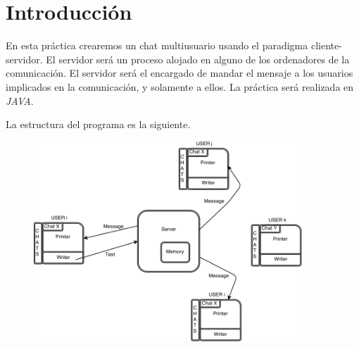 \section{Introducción}
En esta práctica crearemos un chat multiusuario usando el paradigma cliente-servidor.
El servidor será un proceso alojado en alguno de los ordenadores de la comunicación.
El servidor será el encargado de mandar el mensaje a los usuarios implicados en la comunicación, y solamente a ellos.
La práctica será realizada en \textit{JAVA}.

La estructura del programa es la siguiente.

\begin{figure}[h]
	\centering
	\includegraphics[width=0.9\textwidth]{./Imagenes/chat.png}
\end{figure}